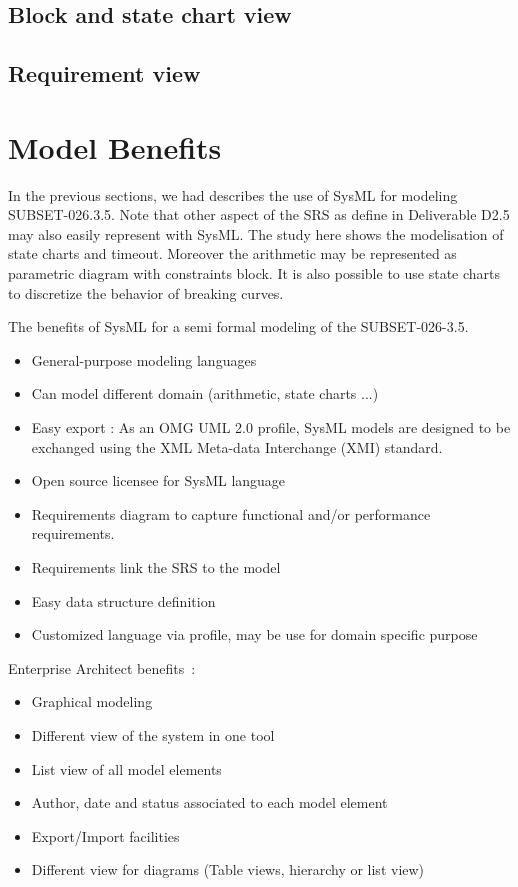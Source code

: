 \documentclass{openetcs_article}
\begin{document}
  \subsection{Block and state chart view}
  

  \subsection{Requirement view}
  

\section{Model Benefits}
\label{sec:model-highlights}

In the previous sections, we had describes the use of SysML for modeling
SUBSET-026.3.5. Note that other aspect of the SRS as define in Deliverable D2.5
may also easily represent with SysML. The study here shows the 
modelisation of state charts and timeout. Moreover the arithmetic may be
represented as parametric diagram with constraints block. It is also possible to
use state charts to discretize the behavior of breaking curves.



The benefits of SysML for a semi formal modeling of the SUBSET-026-3.5.
\begin{itemize}
\item General-purpose  modeling languages
\item Can model different domain (arithmetic, state charts ...)
\item Easy export : As an OMG UML 2.0 profile, SysML models are designed to be
exchanged using the XML Meta-data Interchange (XMI) standard.
\item Open source licensee for SysML language
\item Requirements diagram to capture functional and/or performance requirements.
\item Requirements link the SRS to the model
\item Easy data structure definition
\item Customized language via profile, may be use for domain specific purpose
\end{itemize}
Enterprise Architect benefits~:
\begin{itemize}
\item Graphical modeling
\item Different view of the system in one tool
\item List view of all model elements
\item Author, date and status associated to each model element
\item Export/Import facilities
\item Different view for diagrams (Table views,  hierarchy or list view)
\end{itemize}
\end{document}

